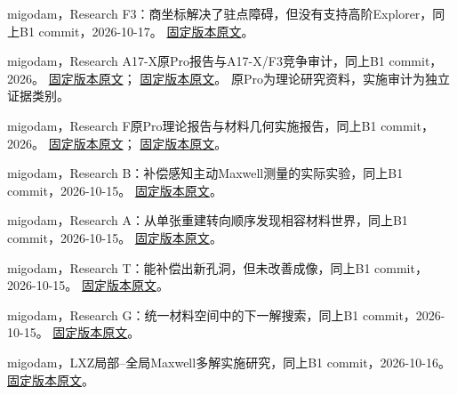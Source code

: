 migodam，Research F3：商坐标解决了驻点障碍，但没有支持高阶Explorer，同上B1 commit，2026-10-17。
\href{https://github.com/migodam/b1-probabilistic-maxwell-imaging/blob/064d0aaed9772cadd573866eec84f159895b317b/research/research_f3_quotient_exploration/RESEARCH_REPORT_ZH.md}{固定版本原文}。

migodam，Research A17-X原Pro报告与A17-X/F3竞争审计，同上B1 commit，2026。
\href{https://github.com/migodam/b1-probabilistic-maxwell-imaging/blob/064d0aaed9772cadd573866eec84f159895b317b/research/a17x_f3_competition_audit/pro_source/report/RESEARCH_A17X_FULL_REPORT_ZH.md}{固定版本原文}；
\href{https://github.com/migodam/b1-probabilistic-maxwell-imaging/blob/064d0aaed9772cadd573866eec84f159895b317b/research/a17x_f3_competition_audit/RESEARCH_REPORT_ZH.md}{固定版本原文}。
原Pro为理论研究资料，实施审计为独立证据类别。

migodam，Research F原Pro理论报告与材料几何实施报告，同上B1 commit，2026。
\href{https://github.com/migodam/b1-probabilistic-maxwell-imaging/blob/064d0aaed9772cadd573866eec84f159895b317b/research/research_f_intrinsic_transport/pro_source/report/RESEARCH_REPORT_ZH.md}{固定版本原文}；
\href{https://github.com/migodam/b1-probabilistic-maxwell-imaging/blob/064d0aaed9772cadd573866eec84f159895b317b/research/research_f_intrinsic_transport/RESEARCH_REPORT_ZH.md}{固定版本原文}。

migodam，Research B：补偿感知主动Maxwell测量的实际实验，同上B1 commit，2026-10-15。
\href{https://github.com/migodam/b1-probabilistic-maxwell-imaging/blob/064d0aaed9772cadd573866eec84f159895b317b/research/research_b/RESEARCH_REPORT_ZH.md}{固定版本原文}。

migodam，Research A：从单张重建转向顺序发现相容材料世界，同上B1 commit，2026-10-15。
\href{https://github.com/migodam/b1-probabilistic-maxwell-imaging/blob/064d0aaed9772cadd573866eec84f159895b317b/research/research_a_20261015/RESEARCH_REPORT_ZH.md}{固定版本原文}。

migodam，Research T：能补偿出新孔洞，但未改善成像，同上B1 commit，2026-10-15。
\href{https://github.com/migodam/b1-probabilistic-maxwell-imaging/blob/064d0aaed9772cadd573866eec84f159895b317b/research/research_t_20261015/RESEARCH_REPORT_ZH.md}{固定版本原文}。

migodam，Research G：统一材料空间中的下一解搜索，同上B1 commit，2026-10-15。
\href{https://github.com/migodam/b1-probabilistic-maxwell-imaging/blob/064d0aaed9772cadd573866eec84f159895b317b/research/research_g_20261015/RESEARCH_G_REPORT_ZH.md}{固定版本原文}。

migodam，LXZ局部--全局Maxwell多解实施研究，同上B1 commit，2026-10-16。
\href{https://github.com/migodam/b1-probabilistic-maxwell-imaging/blob/064d0aaed9772cadd573866eec84f159895b317b/research/research_lxz_20261016/RESEARCH_REPORT_ZH.md}{固定版本原文}。

